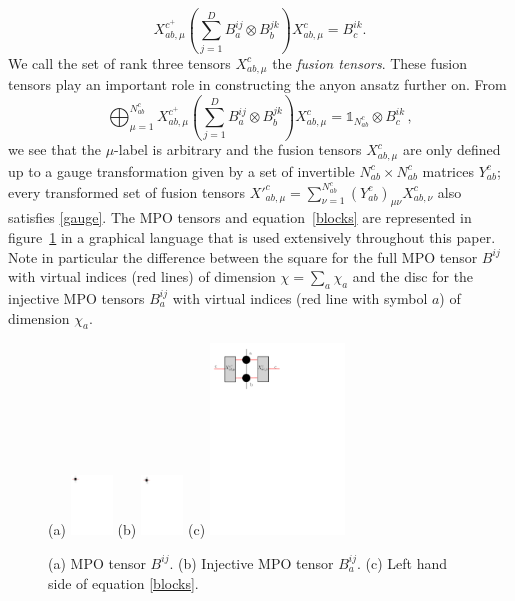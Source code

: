 \documentclass[12 pt]{article}
\begin{document}
\begin{equation} \label{blocks}
X_{ab,\mu}^{c^+}\left(\sum_{j = 1}^D B_a^{ij}\otimes B_b^{jk}\right)X^{c}_{ab,\mu} =  B_c^{ik}.
\end{equation}
We call the set of rank three tensors $X^c_{ab,\mu}$ the \emph{fusion tensors}. These fusion tensors play an important role in constructing the anyon ansatz further on. From
\begin{equation}\label{gauge}
\bigoplus_{\mu = 1}^{N_{ab}^c}X_{ab,\mu}^{c^+}\left(\sum_{j = 1}^D B_a^{ij}\otimes B_b^{jk}\right)X^{c}_{ab,\mu} = \mathds{1}_{N_{ab}^c} \otimes B_c^{ik}\, ,
\end{equation}
we see that the $\mu$-label is arbitrary and the fusion tensors $X_{ab,\mu}^c$ are only defined up to a gauge transformation given by a set of invertible $N_{ab}^c\times N_{ab}^c$ matrices $Y_{ab}^c$; every transformed set of fusion tensors $X'^c_{ab,\mu} = \sum_{\nu = 1}^{N_{ab}^c} (Y^c_{ab})_{\mu\nu}X^c_{ab,\nu}$ also satisfies \eqref{gauge}. The MPO tensors and equation~\eqref{blocks} are represented in figure~\ref{graphical} in a graphical language that is used extensively throughout this paper. Note in particular the difference between the square for the full MPO tensor $B^{ij}$ with virtual indices (red lines) of dimension $\chi=\sum_{a} \chi_{a}$ and the disc for the injective MPO tensors $B^{ij}_a$ with virtual indices (red line with symbol $a$) of dimension $\chi_a$. 

\begin{figure}
  \centering
    (a) \includegraphics[width=0.1\textwidth]{n4}\;\; (b)
    \includegraphics[width=0.1\textwidth]{n5}
    (c) \includegraphics[width=0.32\textwidth]{n7}
\caption{(a) MPO tensor $B^{ij}$. (b) Injective MPO tensor $B^{ij}_a$. (c) Left hand side of equation \eqref{blocks}.}
\label{graphical}
\end{figure}
\end{document}
